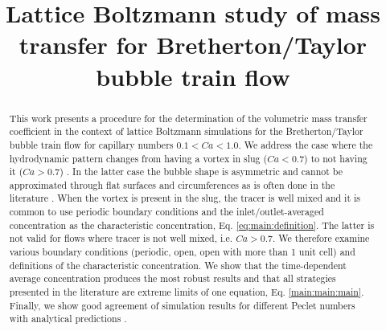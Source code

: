 \documentclass{article}
\title{Lattice Boltzmann study of mass transfer for Bretherton/Taylor bubble train flow}
\begin{document}
\maketitle
\begin{abstract}
This work presents a procedure for the determination of the volumetric mass transfer
coefficient in the context of lattice Boltzmann simulations for the Bretherton/Taylor bubble train
flow for capillary numbers $0.1 < Ca < 1.0$. We address the case where the hydrodynamic pattern changes from having a
vortex in slug ($Ca<0.7$) to not having it ($Ca>0.7$) \cite{giavedoni-numerical}.  In the latter case
the bubble shape is asymmetric and cannot be approximated through flat surfaces and circumferences as
is often done in the literature \cite{vanbaten-circular,kreutzer-overview}.  When the vortex is present
in the slug, the tracer is well mixed and it is common to use periodic boundary conditions and the inlet/outlet-averaged concentration
as the characteristic concentration, Eq. \ref{eq:main:definition}.
The latter is not valid for flows where tracer is not well mixed, i.e. $Ca>0.7$.  We therefore
examine various boundary conditions (periodic, open, open with more than 1 unit cell) and definitions of the characteristic concentration.
We show that the time-dependent average concentration produces the most robust results and
that all strategies presented in the literature are extreme limits of one equation,
Eq. \ref{main:main:main}. Finally, we show good agreement of simulation results for different Peclet numbers
with analytical predictions \citet{vanbaten-circular}.
\end{abstract}
\end{document}
